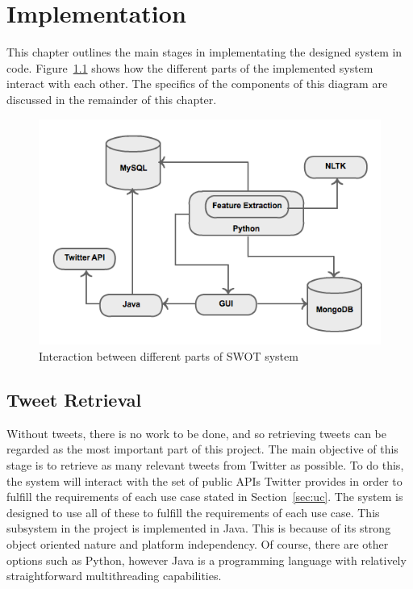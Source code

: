 \chapter{Implementation}
\label{cha:impl}
This chapter outlines the main stages in implementating the designed system in code. Figure~\ref{fig:impl} shows how the different parts of the implemented system interact with each other. The specifics of the components of this diagram are discussed in the remainder of this chapter.

\begin{figure}[h]
\begin{center}
\includegraphics[width=12cm]{impl}
\end{center}
\caption{Interaction between different parts of SWOT system}
\label{fig:impl}
\end{figure}


\java
\section{Tweet Retrieval}
Without tweets, there is no work to be done, and so retrieving tweets can be regarded as the most important part of this project. The main objective of this stage is to retrieve as many relevant tweets from Twitter as possible. To do this, the system will interact with the set of public APIs Twitter provides in order to fulfill the requirements of each use case stated in Section~\ref{sec:uc}. The system is designed to use all of these to fulfill the requirements of each use case. This subsystem in the project is implemented in Java. This is because of its strong object oriented nature and platform independency. Of course, there are other options such as Python, however Java is a programming language with relatively straightforward multithreading capabilities.

